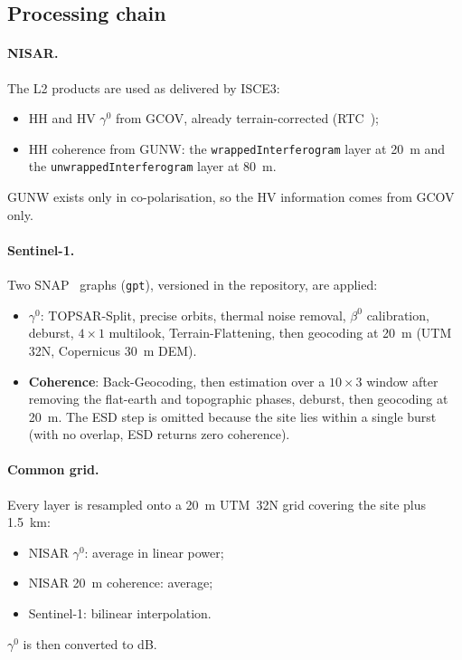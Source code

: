 \documentclass[11pt,a4paper]{article}
\begin{document}
\subsection{Processing chain}

\paragraph{NISAR.} The L2 products are used as delivered by ISCE3:
\begin{itemize}
\item HH and HV $\gamma^0$ from GCOV, already terrain-corrected (RTC~\cite{small2011flattening});
\item HH coherence from GUNW: the \texttt{wrappedInterferogram} layer at 20~m and the
  \texttt{unwrappedInterferogram} layer at 80~m.
\end{itemize}
GUNW exists only in co-polarisation, so the HV information comes from GCOV only.

\paragraph{Sentinel-1.} Two SNAP~\cite{snap} graphs (\texttt{gpt}), versioned in the repository, are applied:
\begin{itemize}
\item \textbf{$\gamma^0$}: TOPSAR-Split, precise orbits, thermal noise removal, $\beta^0$ calibration, deburst,
  $4\times1$ multilook, Terrain-Flattening, then geocoding at 20~m (UTM 32N, Copernicus 30~m DEM).
\item \textbf{Coherence}: Back-Geocoding, then estimation over a $10\times3$ window after removing the flat-earth and
  topographic phases, deburst, then geocoding at 20~m. The ESD step is omitted because the site lies within a
  single burst (with no overlap, ESD returns zero coherence).
\end{itemize}

\paragraph{Common grid.} Every layer is resampled onto a 20~m UTM~32N grid covering the site plus 1.5~km:
\begin{itemize}
\item NISAR $\gamma^0$: average in linear power;
\item NISAR 20~m coherence: average;
\item Sentinel-1: bilinear interpolation.
\end{itemize}
$\gamma^0$ is then converted to dB.
\end{document}
